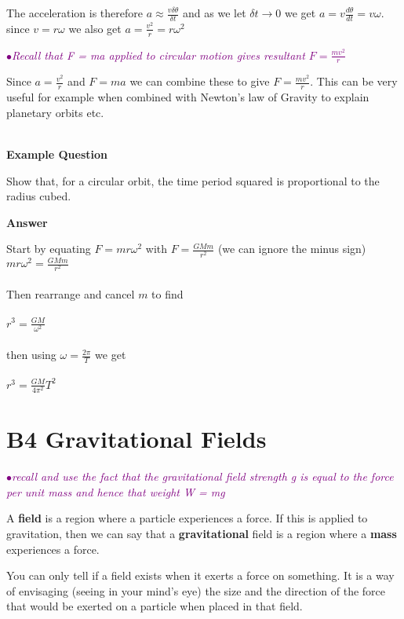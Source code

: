 \documentclass[a4paper,11pt,twoside]{memoir}
\newcounter{spec}[chapter]
\newcommand{\spec}[1]{\Needspace{5\baselineskip}\textcolor{purple}{$\bullet$\hspace{0.5cm}\textit{#1}}}
\newcommand{\answer}{\par \textbf{Answer} \par}
\newenvironment{example}
{\begin{lrbox}{\examplebox}\begin{minipage}{0.9\textwidth}\textbf{Example Question}\par}
{\end{minipage}\end{lrbox}\fbox{\usebox{\examplebox}}}
\begin{document}
The acceleration is therefore $a\approx\frac{v\delta\theta}{\delta t}$ and as we let $\delta t\rightarrow0$ we get $a=v\frac{d\theta}{dt}=v\omega$.
\\
since $v=r\omega$ we also get $a=\frac{v^2}{r}=r\omega^2$



\spec{Recall that F = ma applied to circular motion gives resultant $F=\frac{mv^2}{r}$}

Since $a = \frac{v ^{2}}{r}$ and $F=ma$ we can combine these to give $F=\frac{mv^2}{r}$. This can be very useful for example when combined with Newton's law of Gravity to explain planetary orbits etc.
\\
\\

\begin{example}
	Show that, for a circular orbit, the time period squared is proportional to the radius cubed.

 	\answer Start by equating $F=mr\omega^2$ with $F= \frac{GMm}{r^2}$ (we can ignore the minus sign)
\\

$mr\omega^{2}= \frac{GMm}{r^2}$
\\
\\
Then rearrange and cancel $m$ to find
\\
\\
$r^{3}=\frac{GM}{\omega^2}$
\\
\\
then using $\omega=\frac{2\pi}{T}$ we get
\\
\\
$r^{3}=\frac{GM}{4\pi^{2}}T^2$

\end{example}


\chapter{B4 Gravitational Fields}
\setcounter{spec}{0}
\spec{recall and use the fact that the gravitational field strength g is equal to the force per unit mass and hence that weight W = mg}

A \textbf{field} is a region where a particle experiences a force. If this is applied to gravitation, then we can say that a
\textbf{gravitational} field is a region where a \textbf{mass}
experiences a force.

You can only tell if a field exists when it exerts a force on something.
It is a way of envisaging (seeing in your mind's eye) the size and the
direction of the force that would be exerted on a particle when placed
in that field.
\end{document}
